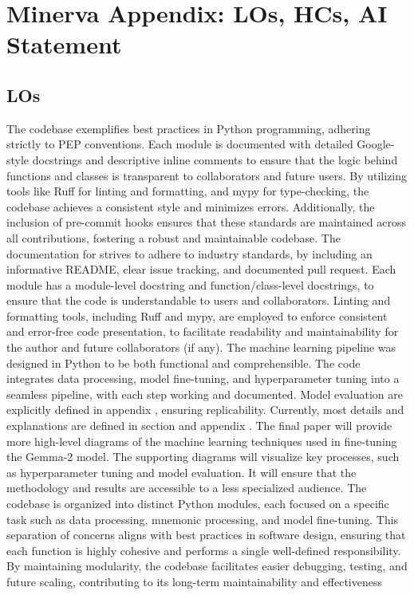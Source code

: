 \section{Minerva Appendix: LOs, HCs, AI Statement} \label{sec:minerva}

\subsection{LOs} \label{sec:los}
 The codebase exemplifies best practices in Python programming, adhering strictly to PEP conventions. Each module is documented with detailed Google-style docstrings and descriptive inline comments to ensure that the logic behind functions and classes is transparent to collaborators and future users. By utilizing tools like Ruff for linting and formatting, and mypy for type-checking, the codebase achieves a consistent style and minimizes errors. Additionally, the inclusion of pre-commit hooks ensures that these standards are maintained across all contributions, fostering a robust and maintainable codebase.
 The documentation for strives to adhere to industry standards, by including an informative README, clear issue tracking, and documented pull request. Each module has a module-level docstring and function/class-level docstrings, to ensure that the code is understandable to users and collaborators. Linting and formatting tools, including Ruff and mypy, are employed to enforce consistent and error-free code presentation, to facilitate readability and maintainability for the author and future collaborators (if any).
 The machine learning pipeline was designed in Python to be both functional and comprehensible. The code integrates data processing, model fine-tuning, and hyperparameter tuning into a seamless pipeline, with each step working and documented. Model evaluation are explicitly defined in appendix , ensuring replicability.
 Currently, most details and explanations are defined in section  and appendix . The final paper will provide more high-level diagrams of the machine learning techniques used in fine-tuning the Gemma-2 model. The supporting diagrams will visualize key processes, such as hyperparameter tuning and model evaluation. It will ensure that the methodology and results are accessible to a less specialized audience.
 The codebase is organized into distinct Python modules, each focused on a specific task such as data processing, mnemonic processing, and model fine-tuning. This separation of concerns aligns with best practices in software design, ensuring that each function is highly cohesive and performs a single well-defined responsibility. By maintaining modularity, the codebase facilitates easier debugging, testing, and future scaling, contributing to its long-term maintainability and effectiveness

